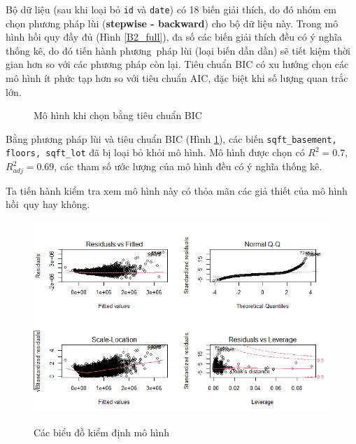 Bộ dữ liệu (sau khi loại bỏ \texttt{id} và \texttt{date}) có 18 biến giải thích, do đó nhóm em chọn phương pháp lùi (\textbf{stepwise - backward}) cho bộ dữ liệu này. Trong mô hình hồi quy đầy đủ (Hình \ref{B2_full}), đa số các biến giải thích đều có ý nghĩa thống kê, do đó tiến hành phương~pháp lùi (loại biến dần dần) sẽ tiết kiệm thời gian hơn so với các phương pháp còn lại.  Tiêu chuẩn BIC có xu hướng chọn các mô hình ít phức tạp hơn so với tiêu chuẩn AIC, đặc biệt khi số lượng quan trắc lớn.

\begin{figure}[H]
	\centering
	\hfill
	\caption{Mô hình khi chọn bằng tiêu chuẩn BIC}
	\label{B2_BIC}
\end{figure}
 Bằng phương pháp lùi và tiêu chuẩn BIC (Hình \ref{B2_BIC}), các biến \texttt{sqft\_basement, floors, sqft\_lot} đã bị loại bỏ khỏi mô hình. Mô hình được chọn có $R^2=0.7$, $R^2_{adj}=0.69$, các tham số ước lượng của mô hình đều có ý nghĩa thống kê.
 
 Ta tiến hành kiểm tra xem mô hình này có thỏa mãn các giả thiết của mô hình hồi~quy hay không.
 
 \begin{figure}[H]
 	\centering
 	{\includegraphics[width=.7\linewidth]{../Photo Of Result/B2_originalmodel}}
 	\caption{Các biểu đồ kiểm định mô hình}
 	\label{B2_check}
 \end{figure}
 
